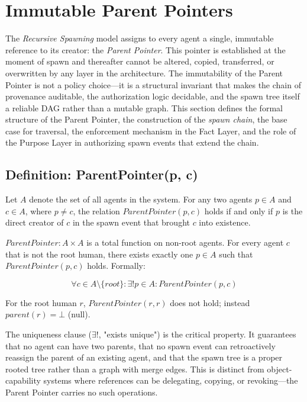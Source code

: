 \section{Immutable Parent Pointers}

The \textit{Recursive Spawning} model assigns to every agent a single, immutable reference to its creator: the \textit{Parent Pointer}. This pointer is established at the moment of spawn and thereafter cannot be altered, copied, transferred, or overwritten by any layer in the architecture. The immutability of the Parent Pointer is not a policy choice—it is a structural invariant that makes the chain of provenance auditable, the authorization logic decidable, and the spawn tree itself a reliable DAG rather than a mutable graph. This section defines the formal structure of the Parent Pointer, the construction of the \textit{spawn chain}, the base case for traversal, the enforcement mechanism in the Fact Layer, and the role of the Purpose Layer in authorizing spawn events that extend the chain.

\subsection{Definition: ParentPointer(p, c)}

Let $A$ denote the set of all agents in the system. For any two agents $p \in A$ and $c \in A$, where $p \neq c$, the relation $ParentPointer(p, c)$ holds if and only if $p$ is the direct creator of $c$ in the spawn event that brought $c$ into existence.

\begin{definition}
\label{def:parent-pointer}
$ParentPointer : A \times A$ is a total function on non-root agents. For every agent $c$ that is not the root human, there exists exactly one $p \in A$ such that $ParentPointer(p, c)$ holds. Formally:

\[
\forall c \in A \setminus \{root\} : \exists! p \in A : ParentPointer(p, c)
\]

For the root human $r$, $ParentPointer(r, r)$ does not hold; instead $parent(r) = \bot$ (null).
\end{definition}

The uniqueness clause ($\exists!$, "exists unique") is the critical property. It guarantees that no agent can have two parents, that no spawn event can retroactively reassign the parent of an existing agent, and that the spawn tree is a proper rooted tree rather than a graph with merge edges. This is distinct from object-capability systems where references can be delegating, copying, or revoking—the Parent Pointer carries no such operations.

